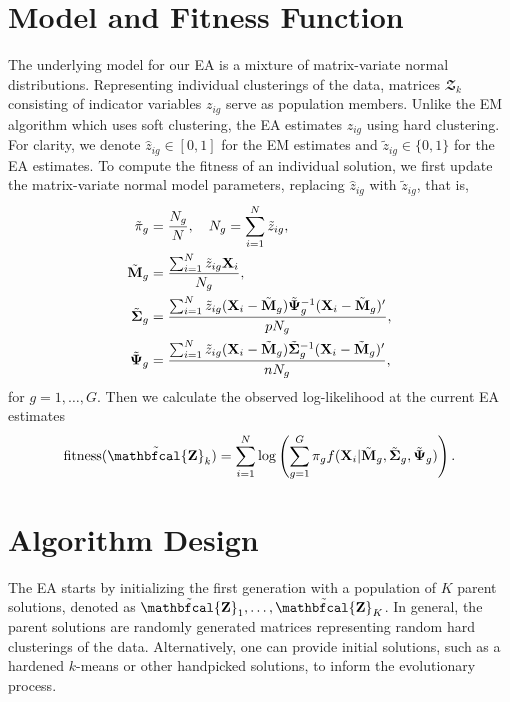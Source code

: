 \documentclass[12pt]{report}
\begin{document}
\section{Model and Fitness Function}
The underlying model for our EA is a mixture of matrix-variate normal distributions. Representing individual clusterings of the data, matrices $\mathbfcal{Z}_k$ consisting of indicator variables $z_{ig}$ serve as population members. Unlike the EM algorithm which uses soft clustering, the EA estimates $z_{ig}$ using hard clustering. For clarity, we denote $\hat{z}_{ig} \in [0, 1]$ for the EM estimates and $\tilde{z}_{ig} \in \{0, 1\}$ for the EA estimates. To compute the fitness of an individual solution, we first update the matrix-variate normal model parameters, replacing $\hat{z}_{ig}$ with $\tilde{z}_{ig}$, that is,
\[
\begin{aligned}
\tilde{\pi}_g & = \frac{N_g}{N}, \quad N_g = \sum_{i=1}^N \tilde{z}_{ig}, \\
\tilde{{\bf M}}_g & = \frac{\sum_{i=1}^N \tilde{z}_{ig}{\bf X}_i}{N_g}, \\
\tilde{{\bf \Sigma}}_g & = \frac{\sum_{i=1}^N \tilde{z}_{ig}({\bf X}_i - \tilde{\bf M}_g) \tilde{\bf \Psi}_g^{-1}({\bf X}_i - \tilde{\bf M}_g)'}{pN_g}, \\
\tilde{{\bf \Psi}}_g & = \frac{\sum_{i=1}^N \tilde{z}_{ig}({\bf X}_i - \tilde{\bf M}_g) \tilde{\bf \Sigma}_g^{-1}({\bf X}_i - \tilde{\bf M}_g)'}{nN_g},
\end{aligned}
\]
for $g = 1, \dots, G$. Then we calculate the observed log-likelihood at the current EA estimates  
\begin{equation*}
\text{fitness}(\tilde{\bf \mathbfcal{Z}}_k) = \sum_{i=1}^N \log \left (\sum_{g=1}^G\pi_g f({\bf X}_i | \tilde{\bf M}_g, \tilde{\bf \Sigma}_g, \tilde{\bf \Psi}_g)\right).
\end{equation*} 




\section{Algorithm Design}
The EA starts by initializing the first generation with a population of $K$ parent solutions, denoted as $\tilde{\bf \mathbfcal{Z}}_1, \dots, \tilde{\bf \mathbfcal{Z}}_K$. In general, the parent solutions are randomly generated matrices representing random hard clusterings of the data. Alternatively, one can provide initial solutions, such as a hardened $k$-means or other handpicked solutions, to inform the evolutionary process.  
\end{document}
